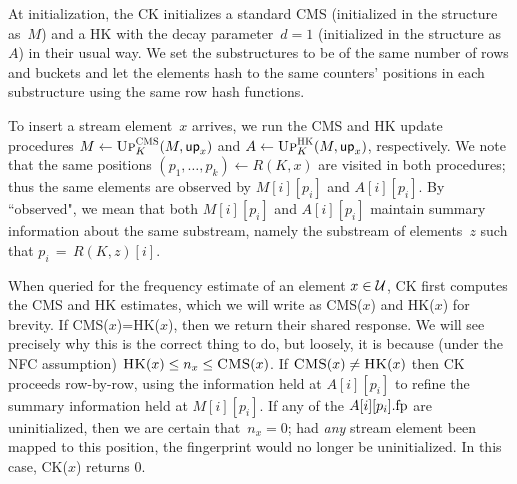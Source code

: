 At initialization, the CK initializes a standard CMS (initialized in the structure as~$M$) and a HK with the decay parameter~$d=1$ (initialized in the structure as~$A$) in their usual way. We set the substructures to be of the same number of rows and buckets and let the elements hash to the same counters' positions in each substructure using the same row hash functions. 

To insert a stream element~$x$ arrives, we run the CMS and HK update procedures $M\gets\textnormal{\textsc{Up}}^{\textnormal{\textsc{CMS}}}_{K}(M,\mathsf{up}_x)$ and $A\gets\textnormal{\textsc{Up}}^{\textnormal{\textsc{HK}}}_{K}(M,\mathsf{up}_x)$, respectively.  We note that the same positions $(p_1,\ldots,p_k) \gets R(K,x)$ are visited in both procedures; thus the same elements are observed by $M[i][p_i]$ and $A[i][p_i]$.  By ``observed", we mean that both $M[i][p_i]$ and $A[i][p_i]$ maintain summary information about the same substream, namely the substream of elements~$z$ such that $p_i\,{=}\,R(K,z)[i]$.




When queried for the frequency estimate of an element $x\in \mathcal{U}$, CK first computes the CMS and HK estimates, which we will write as CMS($x$) and HK($x$) for brevity. If CMS($x$)=HK($x$), then we return their shared response.  We will see precisely why this is the correct thing to do, but loosely, it is because (under the NFC assumption) $\textnormal{\textsc{HK}}(x) \leq n_x \leq \textnormal{\textsc{CMS}}(x)$.  If $\textnormal{\textsc{CMS}}(x) \neq \textnormal{\textsc{HK}}(x)$ then CK proceeds row-by-row, using the information held at $A[i][p_i]$ to refine the summary information held at $M[i][p_i]$.  
If any of the $A[i][p_i].\textup{fp}$ are uninitialized, then we are certain that~$n_x=0$; had \emph{any} stream element been mapped to this position, the fingerprint would no longer be uninitialized.
In this case, CK($x$) returns 0.



